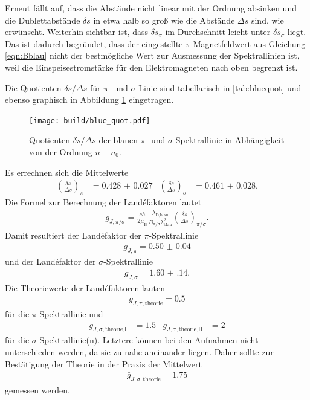 
Erneut fällt auf, dass die Abstände nicht linear mit der Ordnung absinken und die Dublettabstände $\delta s$ in etwa
halb so groß wie die Abstände $\Delta s$ sind, wie erwünscht. Weiterhin sichtbar ist, dass $\delta s_\pi$ im Durchschnitt
leicht unter $\delta s_\sigma$ liegt. Das ist dadurch begründet, dass der eingestellte $\pi$-Magnetfeldwert aus
Gleichung \eqref{eqn:Bblau} nicht der bestmögliche Wert zur Ausmessung der Spektrallinien ist, weil die Einspeisestromstärke
für den Elektromagneten nach oben begrenzt ist.

Die Quotienten $\delta s/\Delta s$ für $\pi$- und $\sigma$-Linie sind tabellarisch in \ref{tab:bluequot} und ebenso
graphisch in Abbildung \ref{fig:bluequot} eingetragen.

\begin{figure}[H]
  \centering
  \texttt{[image: build/blue\_quot.pdf]}
  \caption{Quotienten $\delta s/\Delta s$ der blauen $\pi$- und $\sigma$-Spektrallinie in Abhängigkeit von der Ordnung $n-n_0$.}
  \label{fig:bluequot}
\end{figure}

Es errechnen sich die Mittelwerte
\begin{align}
  \left(\frac{\delta s}{\Delta s}\right)_\pi &= \num{0.428(27)} & \left(\frac{\delta s}{\Delta s}\right)_\sigma &= \num{0.461(28)}.
\end{align}
Die Formel zur Berechnung der Landéfaktoren lautet
\begin{align}
  g_{J,\pi/\sigma} = \frac{c h}{2 \mu_\text{B}} \frac{\lambda_\text{D,blau}}{B_{\pi/\sigma} \lambda_\text{blau}^2} \left(\frac{\delta s}{\Delta s}\right)_{\pi/\sigma}.
\end{align}
Damit resultiert der Landéfaktor der $\pi$-Spektrallinie
\begin{align}
  g_{J,\pi} = \num{0.50(4)}
\end{align}
und der Landéfaktor der $\sigma$-Spektrallinie
\begin{align}
  g_{J,\sigma} = \num{1.60(14)}.
\end{align}
Die Theoriewerte der Landéfaktoren lauten
\begin{align}
  g_{J,\pi,\text{theorie}} = 0.5
\end{align}
für die $\pi$-Spektrallinie und
\begin{align}
  g_{J,\sigma,\text{theorie,I}} &= 1.5 & g_{J,\sigma,\text{theorie,II}} &= 2
\end{align}
für die $\sigma$-Spektrallinie(n). Letztere können bei den Aufnahmen nicht unterschieden
werden, da sie zu nahe aneinander liegen. Daher sollte zur Bestätigung der Theorie in der
Praxis der Mittelwert
\begin{align}
  \bar{g}_{J,\sigma,\text{theorie}} = 1.75
\end{align}
gemessen werden.
